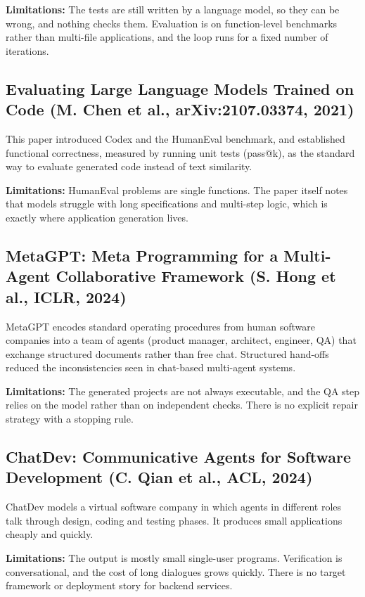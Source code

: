 \documentclass[12pt,a4paper]{report}
\begin{document}
\textbf{Limitations:} The tests are still written by a language model, so they can be wrong, and nothing checks them. Evaluation is on function-level benchmarks rather than multi-file applications, and the loop runs for a fixed number of iterations.

\subsection{Evaluating Large Language Models Trained on Code (M. Chen et al., arXiv:2107.03374, 2021)}

This paper introduced Codex and the HumanEval benchmark, and established functional correctness, measured by running unit tests (pass@k), as the standard way to evaluate generated code instead of text similarity.

\textbf{Limitations:} HumanEval problems are single functions. The paper itself notes that models struggle with long specifications and multi-step logic, which is exactly where application generation lives.

\subsection{MetaGPT: Meta Programming for a Multi-Agent Collaborative Framework (S. Hong et al., ICLR, 2024)}

MetaGPT \cite{hong2024metagpt} encodes standard operating procedures from human software companies into a team of agents (product manager, architect, engineer, QA) that exchange structured documents rather than free chat. Structured hand-offs reduced the inconsistencies seen in chat-based multi-agent systems.

\textbf{Limitations:} The generated projects are not always executable, and the QA step relies on the model rather than on independent checks. There is no explicit repair strategy with a stopping rule.

\subsection{ChatDev: Communicative Agents for Software Development (C. Qian et al., ACL, 2024)}

ChatDev \cite{qian2024chatdev} models a virtual software company in which agents in different roles talk through design, coding and testing phases. It produces small applications cheaply and quickly.

\textbf{Limitations:} The output is mostly small single-user programs. Verification is conversational, and the cost of long dialogues grows quickly. There is no target framework or deployment story for backend services.
\end{document}
